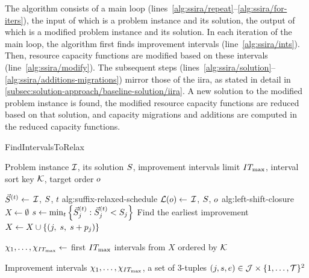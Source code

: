 The algorithm consists of a main loop (lines~\ref{alg:ssira/repeat}--\ref{alg:ssira/for-iters}),
the input of which is a problem instance and its solution,
the output of which is a modified problem instance and its solution.
In each iteration of the main loop, the algorithm first finds improvement intervals (line~\ref{alg:ssira/ints}).
Then, resource capacity functions are modified based on these intervals (line~\ref{alg:ssira/modify}).
The subsequent steps (lines~\ref{alg:ssira/solution}--\ref{alg:ssira/additions-migrations}) mirror those of the \ac{iira},
as stated in detail in \cref{subsec:solution-approach/baseline-solution/iira}.
A new solution to the modified problem instance is found,
the modified resource capacity functions are reduced based on that solution,
and capacity migrations and additions are computed in the reduced capacity functions.


\begin{algorithm}[b]
\caption{FindIntervalsToRelax}
\label{alg:find-intervals-to-relax}
\begin{algorithmic}[1]

\Input  Problem instance $\mathcal{I}$, its solution $S$, improvement intervals limit $IT_{\max}$,
\Inputc interval sort key $\mathcal{K}$, target order $o$

    $\vec{S}^{(t)} \gets$ %
                                        {$\mathcal{I}$, $S$, $t$}%
                                        {alg:suffix-relaxed-schedule}  \label{alg:ssira/ints/schedule-suffixes}
\EndFor
\State $\mathcal{L}(o) \gets$ %
                                              {$\mathcal{I}$, $S$, $o$}%
                                              {alg:left-shift-closure}  \label{alg:ssira/ints/closure}
\State $X \gets \emptyset$  \label{alg:ssira/ints/ints-init}
    \State $s \gets \min_t \left\{ \vec{S}^{(t)}_{j} : \vec{S}^{(t)}_{j} < S_{j} \right\}$  \label{alg:ssira/ints/ints-improvement}
        \Comment Find the earliest improvement
    \State $X \gets X \cup \left\{ (j,\; s,\; s + p_{j}) \right\}$  \label{alg:ssira/ints/ints-inclusion}
\EndFor

\State $\chi_1, \dots, \chi_{IT_{\max}} \gets$ first $IT_{\max}$ intervals from $X$ ordered by $\mathcal{K}$  \label{alg:ssira/ints/select-imp-ints}

\Output  Improvement intervals $\chi_1, \dots, \chi_{IT_{\max}}$,
\Outputc a set of 3-tuples $(j, s, e) \in \mathcal{J} \times \{{1}, \dots, {\mathcal{T}}\}^2$
\end{algorithmic}
\end{algorithm}

